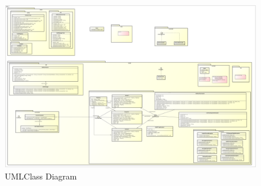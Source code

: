\documentclass[a4paper,12pt]{scrreprt}
\begin{document}
\begin{figure}[h!]
\centering
\caption{UMLClass Diagram}
\label{fig:RTNUmlImage}
\includegraphics[angle=90,width=1.0\textwidth]{RTNUmlImage}
\end{figure}
\end{document}
